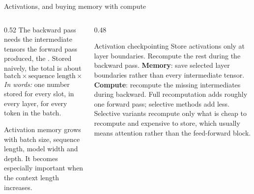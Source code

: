 \documentclass[aspectratio=169,10pt]{beamer}
\begin{document}
\begin{frame}{Activations, and buying memory with compute}
  \begin{columns}[T]
    \begin{column}{0.52\textwidth}
      The backward pass needs the intermediate tensors the forward pass
      produced, the . Stored naively, the total is about
      \[
        \text{batch} \times \text{sequence length} \times \text{model width}
          \times \text{layers}
      \]
      \emph{In words:} one number stored for every slot, in every layer, for
      every token in the batch.
      \vspace{0.4em}

      Activation memory grows with batch size, sequence length, model width and
      depth. It becomes especially important when the context length increases.
    \end{column}
    \begin{column}{0.48\textwidth}
      \begin{block}{Activation checkpointing}
        \small
        Store activations only at layer boundaries. Recompute the rest during
        the backward pass.
        \vspace{0.4em}
        \textbf{Memory}: save selected layer boundaries rather than every
        intermediate tensor.\\[0.3em]
        \textbf{Compute}: recompute the missing intermediates during backward.
        Full recomputation adds roughly one forward pass; selective methods add
        less.
        \vspace{0.4em}
        Selective variants recompute only what is cheap to recompute and
        expensive to store, which usually means attention rather than the
        feed-forward block.
      \end{block}
    \end{column}
  \end{columns}
\end{frame}
\end{document}
